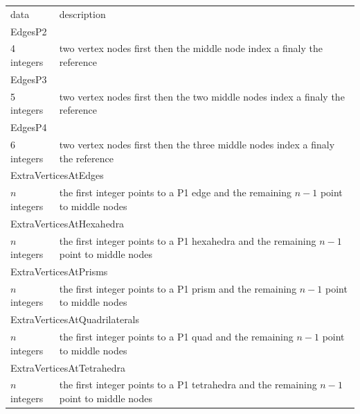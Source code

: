 \documentclass[a4paper,12pt]{article}
\begin{document}
\setlongtables
\begin{longtable}{|m{4cm}|m{11cm}|}
\endhead
\endfoot

\hline
\multicolumn{2}{|l|}{keyword} \\
\hline
data & description \\
\hline\hline

\multicolumn{2}{|l|}{EdgesP2} \\
\hline
4 integers & two vertex nodes first then the middle node index a finaly the reference \\
\hline\hline

\multicolumn{2}{|l|}{EdgesP3} \\
\hline
5 integers & two vertex nodes first then the two middle nodes index a finaly the reference \\
\hline\hline

\multicolumn{2}{|l|}{EdgesP4} \\
\hline
6 integers & two vertex nodes first then the three middle nodes index a finaly the reference \\
\hline\hline

\multicolumn{2}{|l|}{ExtraVerticesAtEdges} \\
\hline
$n$ integers & the first integer points to a P1 edge and the remaining $n-1$ point to middle nodes \\
\hline\hline

\multicolumn{2}{|l|}{ExtraVerticesAtHexahedra} \\
\hline
$n$ integers & the first integer points to a P1 hexahedra and the remaining $n-1$ point to middle nodes \\
\hline\hline

\multicolumn{2}{|l|}{ExtraVerticesAtPrisms} \\
\hline
$n$ integers & the first integer points to a P1 prism and the remaining $n-1$ point to middle nodes \\
\hline\hline

\multicolumn{2}{|l|}{ExtraVerticesAtQuadrilaterals} \\
\hline
$n$ integers & the first integer points to a P1 quad and the remaining $n-1$ point to middle nodes \\
\hline\hline

\multicolumn{2}{|l|}{ExtraVerticesAtTetrahedra} \\
\hline
$n$ integers & the first integer points to a P1 tetrahedra and the remaining $n-1$ point to middle nodes \\
\hline\hline


\end{longtable}
\end{document}
